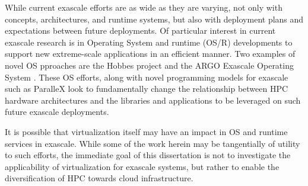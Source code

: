 While current exascale efforts are as wide as they are varying, not only with concepts, architectures, and runtime systems, but also with deployment plans and expectations between future deployments. Of particular interest in current exascale research is in Operating System and runtime (OS/R) developments to support new extreme-scale applications in an efficient manner. Two examples of novel OS pproaches are the Hobbes project \cite{brightwell2013hobbes} and the ARGO Exascale Operating System \cite{perarnau2015argo}. These OS efforts, along with novel programming models for exascale such as ParalleX \cite{sterling2014} look to fundamentally change the relationship between HPC hardware architectures and the libraries and  applications to be leveraged on such future exascale deployments.   

 It is possible that virtualization itself may have an impact in OS and runtime services in exascale\cite{brightwell2013hobbes}. While some of the work herein may be tangentially of utility to such efforts, the immediate goal of this dissertation is not to investigate the applicability of virtualization for exascale systems, but rather to enable the diversification of HPC towards cloud infrastructure.


